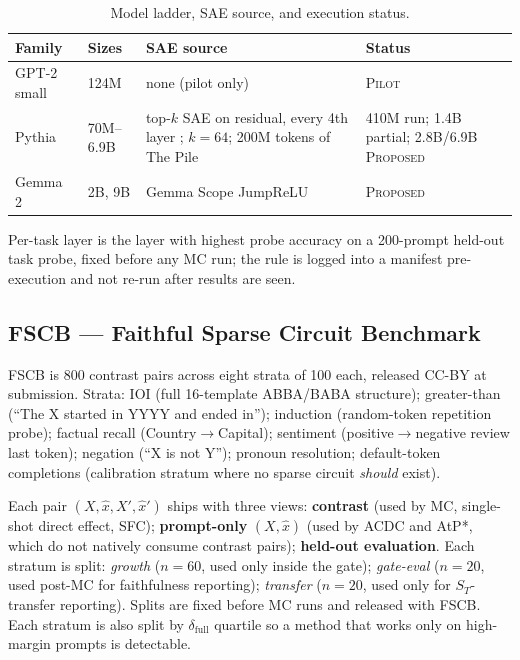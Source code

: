 \documentclass[10pt]{article}
\begin{document}
\begin{table}[t]
\centering
\small
\caption{Model ladder, SAE source, and execution status.}
\label{tab:models}
\begin{tabular}{@{}p{2.6cm}p{1.5cm}p{6.0cm}p{2.6cm}@{}}
\toprule
Family & Sizes & SAE source & Status \\
\midrule
GPT-2 small \citep{radford2019language} & 124M & none (pilot only) & \textsc{Pilot} \\
Pythia \citep{biderman2023pythia} & 70M--6.9B & top-$k$ SAE on residual, every 4th layer \citep{gao2024scaling}; $k=64$; 200M tokens of The Pile \citep{gao2020pile} & 410M run; 1.4B partial; 2.8B/6.9B \textsc{Proposed} \\
Gemma 2 \citep{riviere2024gemma2} & 2B, 9B & Gemma Scope JumpReLU \citep{lieberum2024gemma,rajamanoharan2024jumprelu} & \textsc{Proposed} \\
\bottomrule
\end{tabular}
\end{table}

Per-task layer is the layer with highest probe accuracy on a 200-prompt held-out task probe, fixed before any MC run; the rule is logged into a manifest pre-execution and not re-run after results are seen.

\subsection{FSCB --- Faithful Sparse Circuit Benchmark}

FSCB is 800 contrast pairs across eight strata of 100 each, released CC-BY at submission. Strata: IOI \citep{wang2022interpretability} (full 16-template ABBA/BABA structure); greater-than \citep{hanna2023greater} (``The X started in YYYY and ended in''); induction \citep{olsson2022induction} (random-token repetition probe); factual recall (Country$\to$Capital); sentiment (positive$\to$negative review last token); negation (``X is not Y''); pronoun resolution; default-token completions (calibration stratum where no sparse circuit \emph{should} exist).

Each pair $(X, \hat x, X', \hat x')$ ships with three views: \textbf{contrast} (used by MC, single-shot direct effect, SFC); \textbf{prompt-only} $(X, \hat x)$ (used by ACDC and AtP*, which do not natively consume contrast pairs); \textbf{held-out evaluation}. Each stratum is split: \emph{growth} ($n=60$, used only inside the gate); \emph{gate-eval} ($n=20$, used post-MC for faithfulness reporting); \emph{transfer} ($n=20$, used only for $S_T$-transfer reporting). Splits are fixed before MC runs and released with FSCB. Each stratum is also split by $\delta_{\text{full}}$ quartile so a method that works only on high-margin prompts is detectable.
\end{document}
